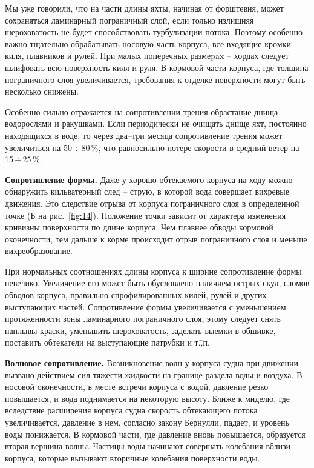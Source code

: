 \documentclass[a4paper, 12pt, twoside, final, book, russian, fittopage, cyremdash]{ncc}
\newcommand{\otdo}{\,\ensuremath{\div}\,}
\newcommand{\ris}[1]{\ref{fig:#1}}
\begin{document}
Мы уже говорили, что на части длины яхты, начиная от форштевня, может сохраняться ламинарный пограничный слой, если только излишняя шероховатость не будет способствовать турбулизации потока. Поэтому особенно важно тщательно обрабатывать носовую часть корпуса, все входящие кромки киля, плавников и рулей. При малых поперечных размеpax \--- хордах следует шлифовать всю поверхность киля и руля. В кормовой части корпуса, где толщина пограничного слоя увеличивается, требования к отделке поверхности могут быть несколько снижены. 

Особенно сильно отражается на сопротивлении трения обрастание днища водорослями и ракушками. Если периодически не очищать днище яхт, постоянно находящихся в воде, то через два--три месяца сопротивление трения может увеличиться на 50\otdo 80\,\%, что равносильно потере скорости в средний ветер на 15\otdo 25\,\%. 

\textbf{Сопротивление формы.} Даже у хорошо обтекаемого корпуса на ходу можно обнаружить кильватерный след \--- струю, в которой вода совершает вихревые движения. Это следствие отрыва от корпуса пограничного слоя в определенной точке (Б на рис.~\ris{14}). Положение точки зависит от характера изменения кривизны поверхности по длине корпуса. Чем плавнее обводы кормовой оконечности, тем дальше к корме происходит отрыв пограничного слоя и меньше вихреобразование. 

При нормальных соотношениях длины корпуса к ширине сопротивление формы невелико. Увеличение его может быть обусловлено наличием острых скул, сломов обводов корпуса, правильно спрофилированных килей, рулей и других выступающих частей. Сопротивление формы увеличивается с уменьшением протяженности зоны ламинарного пограничного слоя, этому следует снять наплывы краски, уменьшить шероховатость, заделать выемки в обшивке, поставить обтекатели на выступающие патрубки и т.\=,п.

\textbf{Волновое сопротивление.} Возникновение волн у корпуса судна при движении вызвано действием сил тяжести жидкости на границе раздела воды и воздуха. В носовой оконечности, в месте встречи корпуса с водой, давление резко повышается, и вода поднимается на некоторую высоту. Ближе к миделю, где вследствие расширения корпуса судна скорость обтекающего потока увеличивается, давление в нем, согласно закону Бернулли, падает, и уровень воды понижается. В кормовой части, где давление вновь повышается, образуется вторая вершина волны. Частицы воды начинают совершать колебания вблизи корпуса, которые вызывают вторичные колебания поверхности воды.
\end{document}
